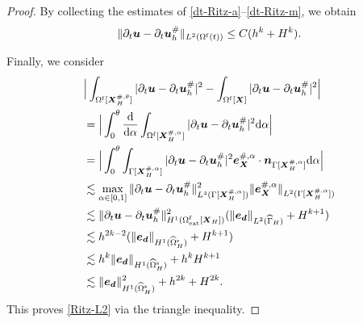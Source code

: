 \documentclass[11pt,reqno]{amsart}
\theoremstyle{definition}
\theoremstyle{plain}
\numberwithin{theorem}{section}
\numberwithin{proposition}{section}
\numberwithin{lemma}{section}
\numberwithin{equation}{section}
\newcommand{\bs}[1]{\boldsymbol{#1}}
\def\d{\mathrm{d}}
\renewcommand{\(}{\bigl(}
\renewcommand{\)}{\bigr)}
\begin{document}
\begin{proof}
By collecting the estimates of \eqref{dt-Ritz-a}--\eqref{dt-Ritz-m}, we obtain 
$$
\|\partial_t{\bs u}-\partial_t{\bs u}_h^\#\|_{L^2(\Omega^{\rm f}(t))}\le C(h^k + H^k). 
$$

Finally, we consider
\begin{align*}
&\Big| \int_{\Omega^{\rm f}[{\bs X}_H^{\#,\theta}]} |\partial_t{\bs u}-\partial_t{\bs u}_h^\#|^2 
- \int_{\Omega^{\rm f}[{\bs X}]} |\partial_t{\bs u}-\partial_t{\bs u}_h^\#|^2 \Big| \\
&= \Big| \int_0^\theta\frac{\d}{\d\alpha}\int_{\Omega^{\rm f}[{\bs X}_H^{\#,\alpha}]} |\partial_t{\bs u}-\partial_t{\bs u}_h^\#|^2 \d\alpha \Big| \\
&= \Big| \int_0^\theta\int_{\Gamma[{\bs X}_H^{\#,\alpha}]} |\partial_t{\bs u}-\partial_t{\bs u}_h^\#|^2 {\bs e}_{\bs X}^{\#,\alpha} \cdot {\bs n}_{\Gamma[{\bs X}_H^{\#,\alpha}]} \d\alpha \Big| \\
&\lesssim \max_{\alpha\in[0,1]} \|\partial_t{\bs u}-\partial_t{\bs u}_h^\#\|_{L^4(\Gamma[{\bs X}_H^{\#,\alpha}])}^2 \|{\bs e}_{\bs X}^{\#,\alpha}\|_{L^2(\Gamma[{\bs X}_H^{\#,\alpha}])} \\
&\lesssim \|\partial_t{\bs u}-\partial_t{\bs u}_h^\#\|_{H^1(\Omega^{\rm f}_{\rm ext}[{\bs X}_H])}^2 
( \|{\bs e}_{\bs d}\|_{L^2(\widehat\Gamma_H)} + H^{k+1}) \\
&\lesssim h^{2k-2} 
( \|{\bs e}_{\bs d}\|_{H^1(\widehat\Omega^{\rm s}_H)} + H^{k+1}) \\
&\lesssim h^k\|{\bs e}_{\bs d}\|_{H^1(\widehat\Omega^{\rm s}_H)} + h^kH^{k+1} \\
&\lesssim \|{\bs e}_{\bs d}\|_{H^1(\widehat\Omega^{\rm s}_H)}^2 + h^{2k}+H^{2k} .
\end{align*}
This proves \eqref{Ritz-L2} via the triangle inequality. 
\end{proof}
\end{document}
